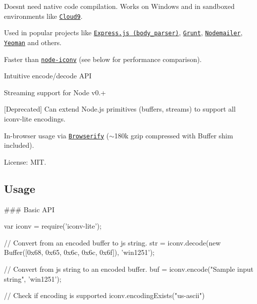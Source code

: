 
\begin{DoxyItemize}
\item Doesn\textquotesingle{}t need native code compilation. Works on Windows and in sandboxed environments like \href{http://c9.io}{\tt Cloud9}.
\item Used in popular projects like \href{https://github.com/expressjs/body-parser}{\tt Express.\+js (body\+\_\+parser)}, \href{http://gruntjs.com/}{\tt Grunt}, \href{http://www.nodemailer.com/}{\tt Nodemailer}, \href{http://yeoman.io/}{\tt Yeoman} and others.
\item Faster than \href{https://github.com/bnoordhuis/node-iconv}{\tt node-\/iconv} (see below for performance comparison).
\item Intuitive encode/decode A\+PI
\item Streaming support for Node v0.+
\item \mbox{[}Deprecated\mbox{]} Can extend Node.\+js primitives (buffers, streams) to support all iconv-\/lite encodings.
\item In-\/browser usage via \href{https://github.com/substack/node-browserify}{\tt Browserify} ($\sim$180k gzip compressed with Buffer shim included).
\item License\+: M\+IT.
\end{DoxyItemize}

\href{https://npmjs.org/packages/iconv-lite/}{\tt }

\subsection*{Usage}

\#\#\# Basic A\+PI 
\begin{DoxyCode}
var iconv = require('iconv-lite');

// Convert from an encoded buffer to js string.
str = iconv.decode(new Buffer([0x68, 0x65, 0x6c, 0x6c, 0x6f]), 'win1251');

// Convert from js string to an encoded buffer.
buf = iconv.encode("Sample input string", 'win1251');

// Check if encoding is supported
iconv.encodingExists("us-ascii")
\end{DoxyCode}


